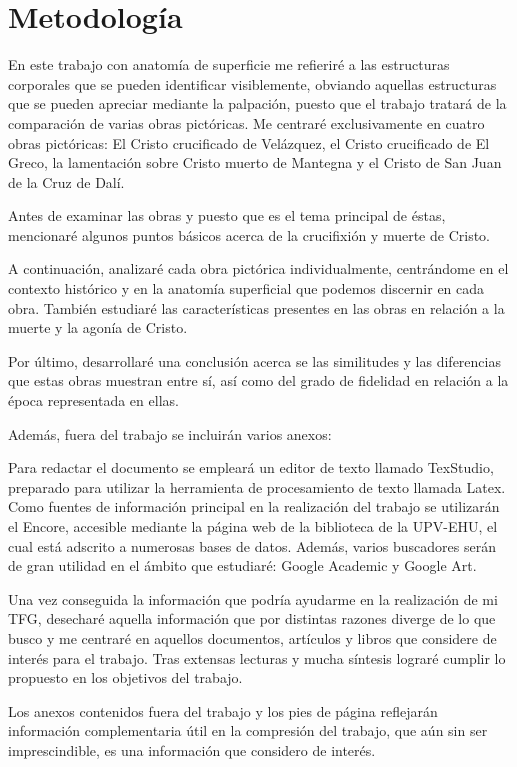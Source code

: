 \section{Metodología}
En este trabajo con anatomía de superficie me refieriré a las estructuras corporales que se pueden identificar visiblemente, obviando aquellas estructuras que se pueden apreciar mediante la palpación, puesto que el trabajo tratará de la comparación de varias obras pictóricas. Me centraré exclusivamente en cuatro obras pictóricas: El Cristo crucificado de Velázquez, el Cristo crucificado de El Greco, la lamentación sobre Cristo muerto de Mantegna %
y el Cristo de San Juan de la Cruz de Dalí.


Antes de examinar las obras y puesto que es el tema principal de éstas, mencionaré algunos puntos básicos acerca de la crucifixión y muerte de Cristo.

A continuación, analizaré cada obra pictórica individualmente, centrándome en el contexto histórico y en la anatomía superficial que podemos discernir en cada obra. También estudiaré las características presentes en las obras en relación a la muerte y la agonía de Cristo.

Por último, desarrollaré una conclusión acerca se las similitudes y las diferencias que estas obras muestran entre sí, así como del grado de fidelidad en relación a la época representada en ellas.

Además, fuera del trabajo se incluirán varios anexos:

\vspace{12pt}

Para redactar el documento se empleará un editor de texto llamado TexStudio, preparado para utilizar la herramienta de procesamiento de texto llamada Latex. Como fuentes de información principal en la realización del trabajo se utilizarán el Encore, accesible mediante la página web de la biblioteca de la UPV-EHU, el cual está adscrito a numerosas bases de datos. Además, varios buscadores serán de gran utilidad en el ámbito que estudiaré: Google Academic y Google Art.

Una vez conseguida la información que podría ayudarme en la realización de mi TFG, desecharé aquella información que por distintas razones diverge de lo que busco y me centraré en aquellos documentos, artículos y libros que considere de interés para el trabajo. Tras extensas lecturas y mucha síntesis lograré cumplir lo propuesto en los objetivos del trabajo.

Los anexos contenidos fuera del trabajo y los pies de página reflejarán información complementaria útil en la compresión del trabajo, que aún sin ser imprescindible, es una información que considero de interés.